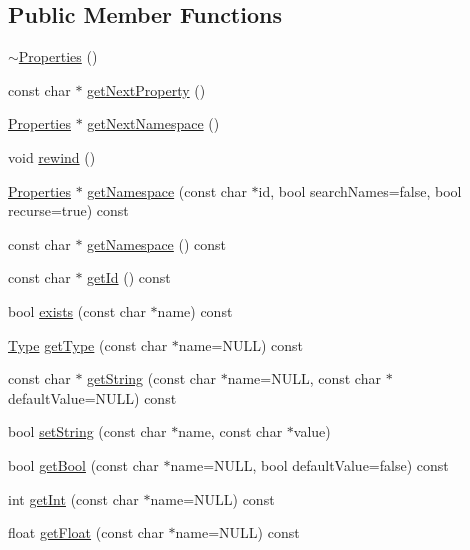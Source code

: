\subsection*{Public Member Functions}
\begin{DoxyCompactItemize}
\item 
\hyperlink{classProperties_a9a4367c64d90a962fc260128587670dd}{$\sim$\+Properties} ()
\item 
const char $\ast$ \hyperlink{classProperties_a396aad2d114059ca157db26c511da196}{get\+Next\+Property} ()
\item 
\hyperlink{classProperties}{Properties} $\ast$ \hyperlink{classProperties_af3933a1797582540f81ef13a981801d3}{get\+Next\+Namespace} ()
\item 
void \hyperlink{classProperties_a5a6eab78915d41d3be2f5b65ee03539d}{rewind} ()
\item 
\hyperlink{classProperties}{Properties} $\ast$ \hyperlink{classProperties_a477722d07bc4b16275f05f82e443b67e}{get\+Namespace} (const char $\ast$id, bool search\+Names=false, bool recurse=true) const
\item 
const char $\ast$ \hyperlink{classProperties_a19fa7257f837ff8faa66c0b4992b8046}{get\+Namespace} () const
\item 
const char $\ast$ \hyperlink{classProperties_a088abb64299002eb5ad7654306db346f}{get\+Id} () const
\item 
bool \hyperlink{classProperties_a4afbc191b79c5994705e85af94045f6a}{exists} (const char $\ast$name) const
\item 
\hyperlink{classProperties_a2d14cc7f8d9f987905632969cc4070e9}{Type} \hyperlink{classProperties_ab851dd2dc6b93048a988ecba9b5adc73}{get\+Type} (const char $\ast$name=N\+U\+LL) const
\item 
const char $\ast$ \hyperlink{classProperties_adaf74082354288405dba508c7d0fe342}{get\+String} (const char $\ast$name=N\+U\+LL, const char $\ast$default\+Value=N\+U\+LL) const
\item 
bool \hyperlink{classProperties_a12c91d3c681f9ace304ac5e48e804cad}{set\+String} (const char $\ast$name, const char $\ast$value)
\item 
bool \hyperlink{classProperties_a71277d94b2486dd4f6f8ca5bde7cfcc8}{get\+Bool} (const char $\ast$name=N\+U\+LL, bool default\+Value=false) const
\item 
int \hyperlink{classProperties_abbea452c3b133805fa955a6e1f91d1db}{get\+Int} (const char $\ast$name=N\+U\+LL) const
\item 
float \hyperlink{classProperties_a4ed868ff9fe81bee289e2e9f5670dbc1}{get\+Float} (const char $\ast$name=N\+U\+LL) const

\end{DoxyCompactItemize}
